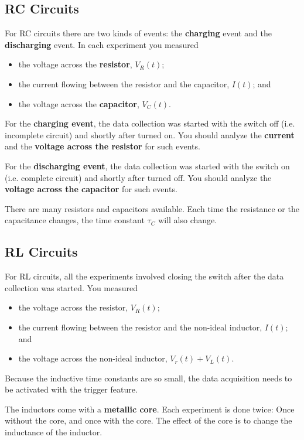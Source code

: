\subsection{RC Circuits}
%
For RC circuits there are two kinds of events: the \textbf{charging} event and the \textbf{discharging} event. In each experiment you measured
\begin{itemize}
    \item the voltage across the \textbf{resistor}, $V_{R}(t)$;
    \item the current flowing between the resistor and the capacitor, $I(t)$; and
    \item the voltage across the \textbf{capacitor}, $V_{C}(t)$.
\end{itemize}
For the \textbf{charging event}, the data collection was started with the switch off (i.e. incomplete circuit) and shortly after turned on. You should analyze the \textbf{current} and the \textbf{voltage across the resistor} for such events.

For the \textbf{discharging event}, the data collection was started with the switch on (i.e. complete circuit) and shortly after turned off. You should analyze the \textbf{voltage across the capacitor} for such events.

There are many resistors and capacitors available. Each time the resistance or the capacitance changes, the time constant $\tau_{C}$ will also change.
%
\subsection{RL Circuits}
%
For RL circuits, all the experiments involved closing the switch after the data collection was started. You measured
\begin{itemize}
    \item the voltage across the resistor, $V_{R}(t)$;
    \item the current flowing between the resistor and the non-ideal inductor, $I(t)$; and
    \item the voltage across the non-ideal inductor, $V_{r}(t) + V_{L}(t)$.
\end{itemize}
Because the inductive time constants are so small, the data acquisition needs to be activated with the trigger feature.

The inductors come with a \textbf{metallic core}. Each experiment is done twice: Once without the core, and once with the core. The effect of the core is to change the inductance of the inductor.


